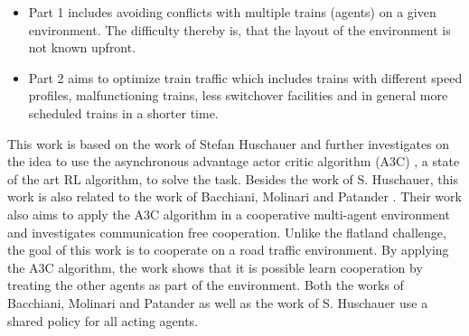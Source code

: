 \begin{itemize}
	\item Part 1 includes avoiding conflicts with multiple trains (agents) on a given environment. The difficulty thereby is, that the layout of the environment is not known upfront.
	\item Part 2 aims to optimize train traffic which includes trains with different speed profiles, malfunctioning trains, less switchover facilities and in general more scheduled trains in a shorter time.
\end{itemize}
This work is based on the work of Stefan Huschauer \cite{flatlandstephan} and further investigates on the idea to use the asynchronous advantage actor critic algorithm (A3C) \cite{a3c}, a state of the art RL algorithm, to solve the task.
Besides the work of S. Huschauer, this work is also related to the work of Bacchiani, Molinari and Patander \cite{marltraffica3c}. Their work also aims to apply the A3C algorithm in a cooperative multi-agent environment and investigates communication free cooperation.
Unlike the flatland challenge, the goal of this work is to cooperate on a road traffic environment. By applying the A3C algorithm, the work shows that it is possible learn cooperation by treating the other agents as part of the environment. Both the works of Bacchiani, Molinari and Patander as well as the work of S. Huschauer use a shared policy for all acting agents.



